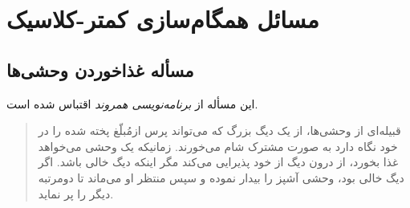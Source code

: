 \documentclass{book}
\newcommand{\clearemptydoublepage}{\newpage\cleardoublepage}
\begin{document}
\clearemptydoublepage
\chapter{مسائل همگام‌سازی کمتر-کلاسیک}
\label{next}


\section{مسأله غذاخوردن وحشی‌ها}

    این مسأله از  \emph{برنامه‌نویسی همروند}   اقتباس شده است\cite{andrews}. 

\begin {quotation}
    قبیله‌ای از وحشی‌ها، از یک دیگ بزرگ که می‌تواند   پرس ازمُبلّغ پخته شده را در خود نگاه دارد به صورت مشترک شام می‌خورند.
    زمانیکه یک وحشی می‌خواهد غذا بخورد، از درون دیگ از خود پذیرایی می‌کند مگر اینکه دیگ خالی باشد. 
    اگر دیگ خالی بود، وحشی آشپز را بیدار نموده و سپس منتظر او می‌ماند تا دومرتبه دیگر را پر نماید.
\end{quotation}
\end{document}
